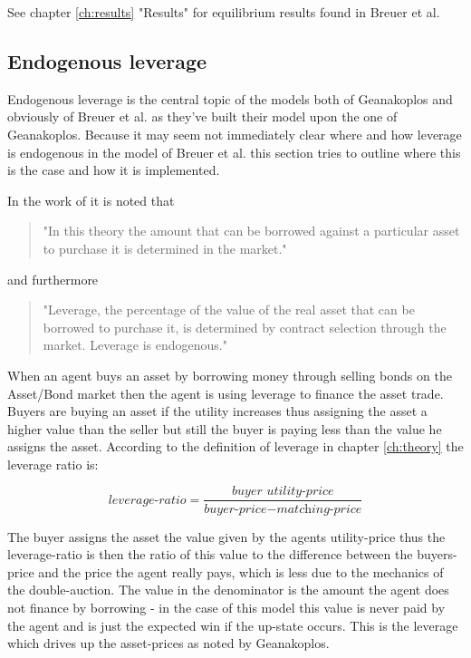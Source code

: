 \documentclass[../Bachelorarbeit.tex]{subfiles}
\begin{document}
\medskip

See chapter \ref{ch:results} "Results" for equilibrium results found in Breuer et al.

\subsection{Endogenous leverage}
Endogenous leverage is the central topic of the models both of Geanakoplos and obviously of Breuer et al. as they've built their model upon the one of Geanakoplos. Because it may seem not immediately clear where and how leverage is endogenous in the model of Breuer et al. this section tries to outline where this is the case and how it is implemented. 

\medskip
In the work of \cite{Breuer2015} it is noted that 
\begin{quote}
"In this theory the amount that can be borrowed against a particular asset to purchase it is determined in the market."
\end{quote}

and furthermore

\begin{quote}
"Leverage, the percentage of the value of the real asset that can be borrowed to purchase it, is determined by contract selection through the market. Leverage is endogenous."
\end{quote}

When an agent buys an asset by borrowing money through selling bonds on the Asset/Bond market then the agent is using leverage to finance the asset trade. Buyers are buying an asset if the utility increases thus assigning the asset a higher value than the seller but still the buyer is paying less than the value he assigns the asset. According to the definition of leverage in chapter \ref{ch:theory} the leverage ratio is:

\begin{equation}
\textit{leverage-ratio} = \frac{\textit{buyer utility-price}}{\textit{buyer-price} - \textit{matching-price}}
\end{equation}

The buyer assigns the asset the value given by the agents utility-price thus the leverage-ratio is then the ratio of this value to the difference between the buyers-price and the price the agent really pays, which is less due to the mechanics of the double-auction. The value in the denominator is the amount the agent does not finance by borrowing - in the case of this model this value is never paid by the agent and is just the expected win if the up-state occurs. This is the leverage which drives up the asset-prices as noted by Geanakoplos.
\end{document}
